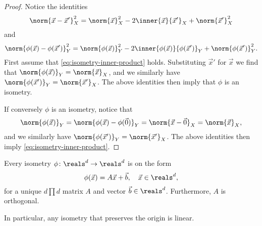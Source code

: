 \documentclass[article, a4paper, 11pt, oneside]{memoir}
\numberwithin{equation}{chapter}
\begin{document}
\begin{proof}
    Notice the identities
    \begin{equation*}
        \norm{\vec{x} - \vec{x}'}_X^2
            = \norm{\vec{x}}_X^2 - 2 \inner{\vec{x}}{\vec{x}'}_X + \norm{\vec{x}'}_X^2
    \end{equation*}
    and
    \begin{equation*}
        \norm{\phi(\vec{x}) - \phi(\vec{x}')}_Y^2
            = \norm{\phi(\vec{x})}_Y^2 - 2 \inner{\phi(\vec{x})}{\phi(\vec{x}')}_Y + \norm{\phi(\vec{x}')}_Y^2.
    \end{equation*}
    First assume that \cref{eq:isometry-inner-product} holds. Substituting $\vec{x}'$ for $\vec{x}$ we find that $\norm{\phi(\vec{x})}_Y = \norm{\vec{x}}_X$, and we similarly have $\norm{\phi(\vec{x}')}_Y = \norm{\vec{x}'}_X$. The above identities then imply that $\phi$ is an isometry.
    
    If conversely $\phi$ is an isometry, notice that
    \begin{equation*}
        \norm{\phi(\vec{x})}_Y
            = \norm{\phi(\vec{x}) - \phi(\vec{0})}_Y
            = \norm{\vec{x} - \vec{0}}_X
            = \norm{\vec{x}}_X,
    \end{equation*}
    and we similarly have $\norm{\phi(\vec{x}')}_Y = \norm{\vec{x}'}_X$. The above identities then imply \cref{eq:isometry-inner-product}.
\end{proof}

\begin{proposition}
    \label{prop:isometry-characterisation-Euclidean-space}
    Every isometry $\phi \colon \reals^d \to \reals^d$ is on the form
    \begin{equation*}
        \phi(\vec{x})
            = A \vec{x} + \vec{b}, \quad \vec{x} \in \reals^d,
    \end{equation*}
    for a unique $d \prod d$ matrix $A$ and vector $\vec{b} \in \reals^d$. Furthermore, $A$ is orthogonal.
\end{proposition}
%
In particular, any isometry that preserves the origin is linear.
\end{document}
